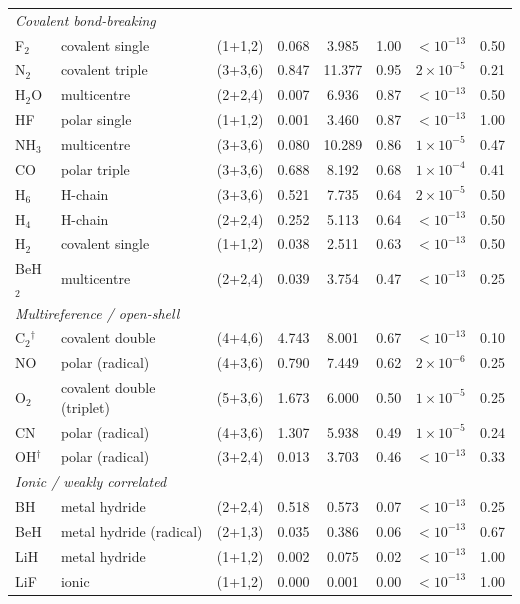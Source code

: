 \begin{table}[tp]
\begin{tabular}{llcccccc}
\multicolumn{8}{l}{\emph{Covalent bond-breaking}}\\
F$_2$ & covalent single & (1+1,2) & 0.068 & 3.985 & 1.00 & $<\!10^{-13}$ & 0.50 \\
N$_2$ & covalent triple & (3+3,6) & 0.847 & 11.377 & 0.95 & $2\times10^{-5}$ & 0.21 \\
H$_2$O & multicentre & (2+2,4) & 0.007 & 6.936 & 0.87 & $<\!10^{-13}$ & 0.50 \\
HF & polar single & (1+1,2) & 0.001 & 3.460 & 0.87 & $<\!10^{-13}$ & 1.00 \\
NH$_3$ & multicentre & (3+3,6) & 0.080 & 10.289 & 0.86 & $1\times10^{-5}$ & 0.47 \\
CO & polar triple & (3+3,6) & 0.688 & 8.192 & 0.68 & $1\times10^{-4}$ & 0.41 \\
H$_6$ & H-chain & (3+3,6) & 0.521 & 7.735 & 0.64 & $2\times10^{-5}$ & 0.50 \\
H$_4$ & H-chain & (2+2,4) & 0.252 & 5.113 & 0.64 & $<\!10^{-13}$ & 0.50 \\
H$_2$ & covalent single & (1+1,2) & 0.038 & 2.511 & 0.63 & $<\!10^{-13}$ & 0.50 \\
BeH$_2$ & multicentre & (2+2,4) & 0.039 & 3.754 & 0.47 & $<\!10^{-13}$ & 0.25 \\
\multicolumn{8}{l}{\emph{Multireference / open-shell}}\\
C$_2$$^{\dagger}$ & covalent double & (4+4,6) & 4.743 & 8.001 & 0.67 & $<\!10^{-13}$ & 0.10 \\
NO & polar (radical) & (4+3,6) & 0.790 & 7.449 & 0.62 & $2\times10^{-6}$ & 0.25 \\
O$_2$ & covalent double (triplet) & (5+3,6) & 1.673 & 6.000 & 0.50 & $1\times10^{-5}$ & 0.25 \\
CN & polar (radical) & (4+3,6) & 1.307 & 5.938 & 0.49 & $1\times10^{-5}$ & 0.24 \\
OH$^{\dagger}$ & polar (radical) & (3+2,4) & 0.013 & 3.703 & 0.46 & $<\!10^{-13}$ & 0.33 \\
\multicolumn{8}{l}{\emph{Ionic / weakly correlated}}\\
BH & metal hydride & (2+2,4) & 0.518 & 0.573 & 0.07 & $<\!10^{-13}$ & 0.25 \\
BeH & metal hydride (radical) & (2+1,3) & 0.035 & 0.386 & 0.06 & $<\!10^{-13}$ & 0.67 \\
LiH & metal hydride & (1+1,2) & 0.002 & 0.075 & 0.02 & $<\!10^{-13}$ & 1.00 \\
LiF & ionic & (1+1,2) & 0.000 & 0.001 & 0.00 & $<\!10^{-13}$ & 1.00 \\
\hline\hline\end{tabular}
\end{table}
